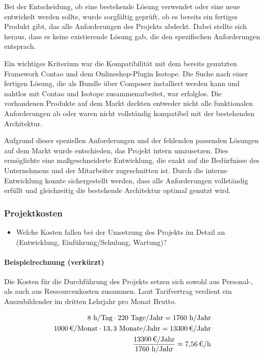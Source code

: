 Bei der Entscheidung, ob eine bestehende Lösung verwendet oder eine neue entwickelt werden sollte, wurde sorgfältig geprüft, ob es bereits ein fertiges Produkt gibt, das alle Anforderungen des Projekts abdeckt. Dabei stellte sich heraus, dass es keine existierende Lösung gab, die den spezifischen Anforderungen entsprach.

Ein wichtiges Kriterium war die Kompatibilität mit dem bereits genutzten Framework Contao und dem Onlineshop-Plugin Isotope. Die Suche nach einer fertigen Lösung, die als Bundle über Composer installiert werden kann und nahtlos mit Contao und Isotope zusammenarbeitet, war erfolglos. Die vorhandenen Produkte auf dem Markt deckten entweder nicht alle funktionalen Anforderungen ab oder waren nicht vollständig kompatibel mit der bestehenden Architektur.

Aufgrund dieser speziellen Anforderungen und der fehlenden passenden Lösungen auf dem Markt wurde entschieden, das Projekt intern umzusetzen. Dies ermöglichte eine maßgeschneiderte Entwicklung, die exakt auf die Bedürfnisse des Unternehmens und der Mitarbeiter zugeschnitten ist. Durch die interne Entwicklung konnte sichergestellt werden, dass alle Anforderungen vollständig erfüllt und gleichzeitig die bestehende Architektur optimal genutzt wird.

\subsubsection{Projektkosten}
\label{sec:Projektkosten}
\begin{itemize}
	\item Welche Kosten fallen bei der Umsetzung des Projekts im Detail an (\zB Entwicklung, Einführung/Schulung, Wartung)?
\end{itemize}

\paragraph{Beispielrechnung (verkürzt)}
Die Kosten für die Durchführung des Projekts setzen sich sowohl aus Personal-, als auch aus Ressourcenkosten zusammen.
Laut Tarifvertrag verdient ein Auszubildender im dritten Lehrjahr pro Monat  Brutto. 

\begin{eqnarray}
8 \mbox{ h/Tag} \cdot 220 \mbox{ Tage/Jahr} = 1760 \mbox{ h/Jahr}\\
\eur{1000}\mbox{/Monat} \cdot 13,3 \mbox{ Monate/Jahr} = \eur{13300} \mbox{/Jahr}\\
\frac{\eur{13300} \mbox{/Jahr}}{1760 \mbox{ h/Jahr}} \approx \eur{7,56}\mbox{/h}
\end{eqnarray}

